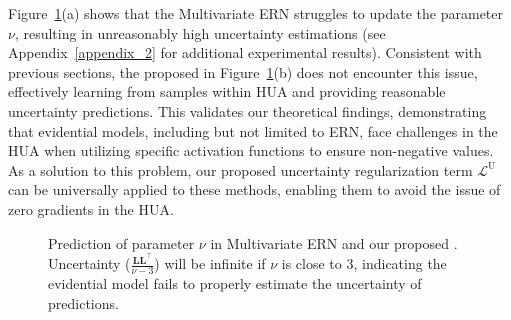 Figure~\ref{fig:multivariate}(a) shows that the Multivariate ERN struggles to update the parameter $\nu$, resulting in unreasonably high uncertainty estimations (see Appendix~\ref{appendix_2} for additional experimental results). Consistent with previous sections, the proposed \ours in Figure~\ref{fig:multivariate}(b) does not encounter this issue, effectively learning from samples within HUA and providing reasonable uncertainty predictions. This validates our theoretical findings, demonstrating that evidential models, including but not limited to ERN, face challenges in the HUA when utilizing specific activation functions to ensure non-negative values. As a solution to this problem, our proposed uncertainty regularization term $\mathcal{L}^{\mathrm{U}}$ can be universally applied to these methods, enabling them to avoid the issue of zero gradients in the HUA.


\begin{figure}[h!]
    \centering
    \caption{Prediction of parameter $\nu$ in Multivariate ERN and our proposed \ours. Uncertainty ($\frac{\boldsymbol{L} \boldsymbol{L}^{\top}}{\nu-3}$) will be infinite if $\nu$ is close to 3, indicating the evidential model fails to properly estimate the uncertainty of predictions.}
    \label{fig:multivariate}
\end{figure}


